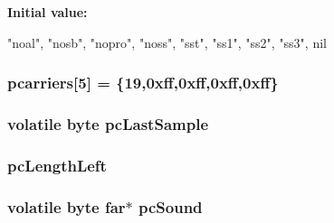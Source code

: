 \label{ID__SD_8C_af8599e1c1fbb3afabbdaa22e7c4a94b0}
{\bfseries Initial value:}
\begin{DoxyCode}

                                                {
                                                        "noal",
                                                        "nosb",
                                                        "nopro",
                                                        "noss",
                                                        "sst",
                                                        "ss1",
                                                        "ss2",
                                                        "ss3",
                                                        nil
                                                }
\end{DoxyCode}
\hypertarget{ID__SD_8C_abbe10755880e6acbb43dbc7a5709a3de}{
\subsubsection[{pcarriers}]{ {\bf pcarriers}\mbox{[}5\mbox{]} = \{19,0xff,0xff,0xff,0xff\}}}
\label{ID__SD_8C_abbe10755880e6acbb43dbc7a5709a3de}
\hypertarget{ID__SD_8C_ae1039a6b232e32369a231bb2031bfe69}{
\subsubsection[{pcLastSample}]{\setlength{\rightskip}{0pt plus 5cm}volatile {\bf byte} {\bf pcLastSample}}}
\label{ID__SD_8C_ae1039a6b232e32369a231bb2031bfe69}
\hypertarget{ID__SD_8C_af057ee8e6effd1195904b1b8be9412f3}{
\subsubsection[{pcLengthLeft}]{ {\bf pcLengthLeft}}}
\label{ID__SD_8C_af057ee8e6effd1195904b1b8be9412f3}
\hypertarget{ID__SD_8C_af79ef9eaf2fc8ba85f289bd19e36a6c5}{
\subsubsection[{pcSound}]{\setlength{\rightskip}{0pt plus 5cm}volatile {\bf byte} far$\ast$ {\bf pcSound}}}
